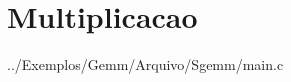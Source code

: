 \hypertarget{_multiplicacao-example}{}\section{Multiplicacao}
../\+Exemplos/\+Gemm/\+Arquivo/\+Sgemm/main.c


\begin{DoxyCodeInclude}
\end{DoxyCodeInclude}
 